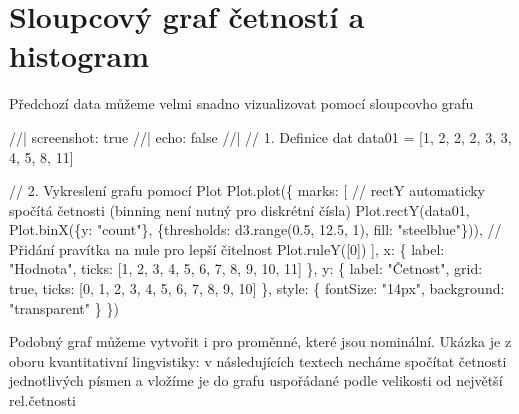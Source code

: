 \documentclass[
  czech,
  11pt,
  letterpaper,
  DIV=11,
  numbers=noendperiod]{scrreprt}
\newenvironment{Shaded}{\begin{snugshade}}{\end{snugshade}}
\newcommand{\NormalTok}[1]{\textcolor[rgb]{0.00,0.23,0.31}{#1}}
\begin{document}
\section{Sloupcový graf četností a
histogram}\label{sloupcovuxfd-graf-ux10detnostuxed-a-histogram}

Předchozí data můžeme velmi snadno vizualizovat pomocí sloupcovho grafu

\begin{Shaded}
\begin{Highlighting}[]
\NormalTok{  //| screenshot: true}
\NormalTok{  //| echo: false}
\NormalTok{  //| }
\NormalTok{  // 1. Definice dat}
\NormalTok{  data01 = [1, 2, 2, 2, 3, 3, 4, 5, 8, 11]}

\NormalTok{  // 2. Vykreslení grafu pomocí Plot}
\NormalTok{  Plot.plot(\{}
\NormalTok{    marks: [}
\NormalTok{      // rectY automaticky spočítá četnosti (binning není nutný pro diskrétní čísla)}
\NormalTok{      Plot.rectY(data01, Plot.binX(\{y: "count"\}, \{thresholds: d3.range(0.5, 12.5, 1), fill: "steelblue"\})),}
\NormalTok{      // Přidání pravítka na nule pro lepší čitelnost}
\NormalTok{      Plot.ruleY([0])}
\NormalTok{    ],}
\NormalTok{    x: \{}
\NormalTok{      label: "Hodnota",}
\NormalTok{      ticks: [1, 2, 3, 4, 5, 6, 7, 8, 9, 10, 11]}
\NormalTok{    \},}
\NormalTok{    y: \{}
\NormalTok{      label: "Četnost",}
\NormalTok{      grid: true,}
\NormalTok{      ticks: [0, 1, 2, 3, 4, 5, 6, 7, 8, 9, 10]}
\NormalTok{    \},}
\NormalTok{    style: \{}
\NormalTok{      fontSize: "14px",}
\NormalTok{      background: "transparent"}
\NormalTok{    \}}
\NormalTok{  \})}
\end{Highlighting}
\end{Shaded}

Podobný graf můžeme vytvořit i pro proměnné, které jsou nominální.
Ukázka je z oboru kvantitativní lingvistiky: v následujících textech
necháme spočítat četnosti jednotlivých písmen a vložíme je do grafu
uspořádané podle velikosti od největší rel.četnosti
\end{document}
